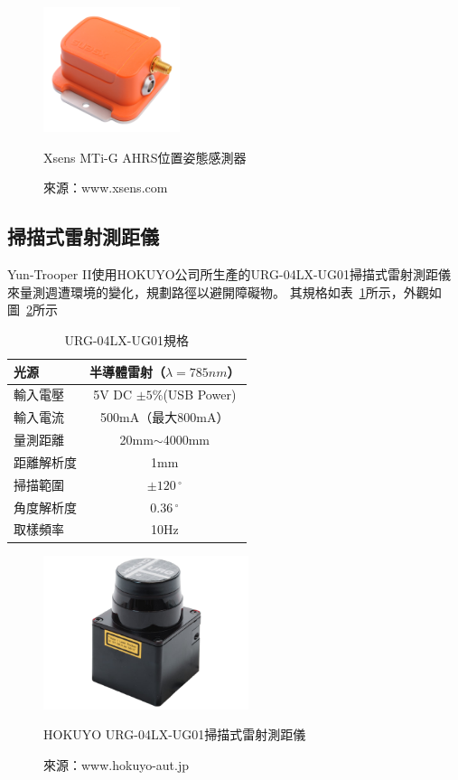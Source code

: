 \begin{figure}[h!]
	\centering
	\includegraphics[width=4cm]{figures/MTi-G}
	\caption{Xsens MTi-G AHRS位置姿態感測器}
	\caption*{來源：www.xsens.com}
	\label{f:MTi-G}
\end{figure}

\subsection{掃描式雷射測距儀}
Yun-Trooper II使用HOKUYO公司所生產的URG-04LX-UG01掃描式雷射測距儀來量測週遭環境的變化，規劃路徑以避開障礙物。
其規格如表~\ref{t:urg-specs}所示，外觀如圖~\ref{f:urg}所示

\begin{table}[h!]
	\centering
	\caption{URG-04LX-UG01規格}
	\label{t:urg-specs}
	\begin{tabular}{| l | c |}
		\hline
		光源 & 半導體雷射（$\lambda = 785nm$） \\ \hline
		輸入電壓 & 5V DC $\pm 5\%$(USB Power) \\ \hline
		輸入電流 & 500mA（最大800mA） \\ \hline
		量測距離 & 20mm$\sim$4000mm \\ \hline
		距離解析度 & 1mm \\ \hline
		掃描範圍 & $\pm 120\,^{\circ}$ \\ \hline
		角度解析度 & $0.36\,^{\circ}$ \\ \hline
		取樣頻率 & 10Hz \\
		\hline
	\end{tabular}
\end{table}

\begin{figure}[h!]
	\centering
	\includegraphics[width=6cm]{figures/URG-04LX-UG01}
	\caption{HOKUYO URG-04LX-UG01掃描式雷射測距儀}
	\caption*{來源：www.hokuyo-aut.jp}
	\label{f:urg}
\end{figure}

